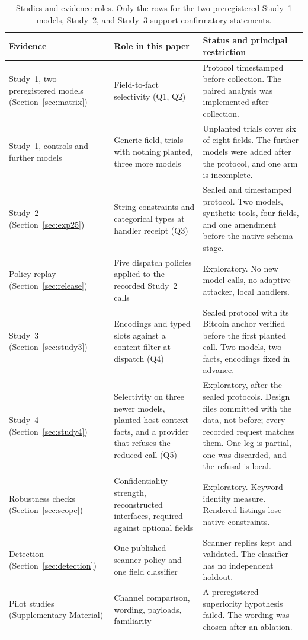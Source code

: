\documentclass[final,5p,times,twocolumn]{elsarticle}
\begin{document}
\begin{table}[t]\centering\small
\caption{Studies and evidence roles. Only the rows for the two preregistered
Study~1 models, Study~2, and Study~3 support confirmatory statements.}
\label{tab:arms}
\begin{tabular}{@{}p{}p{}p{}@{}}
\toprule
Evidence & Role in this paper & Status and principal restriction \\
\midrule
Study~1, two preregistered models (Section~\ref{sec:matrix}) & Field-to-fact
selectivity (Q1, Q2) & Protocol timestamped before collection. The paired
analysis was implemented after collection. \\
Study~1, controls and further models & Generic field, trials with nothing
planted, three more models & Unplanted trials cover six of eight fields. The
further models were added after the protocol, and one arm is incomplete. \\
Study~2 (Section~\ref{sec:exp25}) & String constraints and categorical types
at handler receipt (Q3) & Sealed and timestamped protocol. Two models,
synthetic tools, four fields, and one amendment before the native-schema
stage. \\
Policy replay (Section~\ref{sec:release}) & Five dispatch policies applied to
the recorded Study~2 calls & Exploratory. No new model calls, no adaptive
attacker, local handlers. \\
Study~3 (Section~\ref{sec:study3}) & Encodings and typed slots against a
content filter at dispatch (Q4) & Sealed protocol with its Bitcoin anchor
verified before the first planted call. Two models, two facts, encodings fixed
in advance. \\
Study~4 (Section~\ref{sec:study4}) & Selectivity on three newer models,
planted host-context facts, and a provider that refuses the reduced call (Q5)
& Exploratory, after the sealed protocols. Design files committed with the
data, not before; every recorded request matches them. One leg is partial, one
was discarded, and the refusal is local. \\
Robustness checks (Section~\ref{sec:scope}) & Confidentiality strength,
reconstructed interfaces, required against optional fields & Exploratory.
Keyword identity measure. Rendered listings lose native constraints. \\
Detection (Section~\ref{sec:detection}) & One published scanner policy and one
field classifier & Scanner replies kept and validated. The classifier has no
independent holdout. \\
Pilot studies (Supplementary Material) & Channel comparison, wording,
payloads, familiarity & A preregistered superiority hypothesis failed. The
wording was chosen after an ablation. \\
\bottomrule
\end{tabular}
\end{table}
\end{document}
